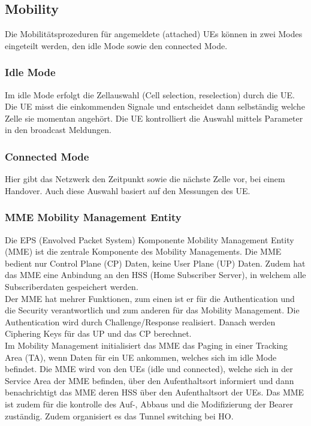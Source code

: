 \subsection{Mobility}
Die Mobilitätsprozeduren für angemeldete (attached) UEs können in zwei Modes eingeteilt werden, den idle Mode sowie den connected Mode.
\subsubsection{Idle Mode}
Im idle Mode erfolgt die Zellauswahl (Cell selection, reselection) durch die UE. Die UE misst die einkommenden Signale und entscheidet dann selbständig welche Zelle sie momentan angehört. Die UE kontrolliert die Auswahl mittels Parameter in den broadcast Meldungen.
\subsubsection{Connected Mode}
Hier gibt das Netzwerk den Zeitpunkt sowie die nächste Zelle vor, bei einem Handover. Auch diese Auswahl basiert auf den Messungen des UE.

\subsubsection{MME Mobility Management Entity}
Die EPS (Envolved Packet System) Komponente Mobility Management Entity (MME) ist die zentrale Komponente des Mobility Managements. Die MME bedient nur Control Plane (CP) Daten, keine User Plane (UP) Daten. Zudem hat das MME eine Anbindung an den HSS (Home Subscriber Server), in welchem alle Subscriberdaten gespeichert werden. \\
Der MME hat mehrer Funktionen, zum einen ist er für die Authentication und die Security verantwortlich und zum anderen für das Mobility Management. Die Authentication wird durch Challenge/Response realisiert. Danach werden Ciphering Keys für das UP und das CP berechnet.\\
Im Mobility Management initialisiert das MME das Paging in einer Tracking Area (TA), wenn Daten für ein UE ankommen, welches sich im idle Mode befindet. Die MME wird von den UEs (idle und connected), welche sich in der Service Area der MME befinden, über den Aufenthaltsort informiert und dann benachrichtigt das MME deren HSS über den Aufenthaltsort der UEs. Das MME ist zudem für die kontrolle des Auf-, Abbaus und die Modifizierung der Bearer zuständig. Zudem organisiert es das Tunnel switching bei HO. \\
